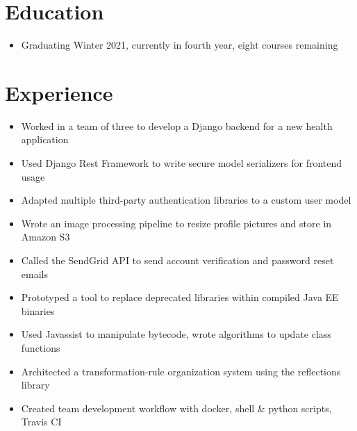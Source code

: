 \documentclass[]{rcf_cv}
\begin{document}
	
	

	\section{Education}
	
		\begin{itemize}
			\setlength\itemsep{-0.4em}
			\renewcommand\labelitemi{--}
			
			\item Graduating Winter 2021, currently in fourth year, eight courses remaining
					
			
			
		\end{itemize}
	
	\section{Experience}
	
		
		\begin{itemize}
			\setlength\itemsep{-0.4em}
			\renewcommand\labelitemi{--}
		
			\item Worked in a team of three to develop a Django backend for a new health application
			\item Used Django Rest Framework to write secure model serializers for frontend usage
			\item Adapted multiple third-party authentication libraries to a custom user model
			\item Wrote an image processing pipeline to resize profile pictures and store in Amazon S3
			\item Called the SendGrid API to send account verification and password reset emails

		\end{itemize}
	
		\begin{itemize}
			\setlength\itemsep{-0.4em}
			\renewcommand\labelitemi{--}
			
			\item Prototyped a tool to replace deprecated libraries within compiled Java EE binaries
			\item Used Javassist to manipulate bytecode, wrote algorithms to update class functions
			\item Architected a transformation-rule organization system using the reflections library
			\item Created team development workflow with docker, shell \& python scripts, Travis CI

		\end{itemize}
	
\end{document}
